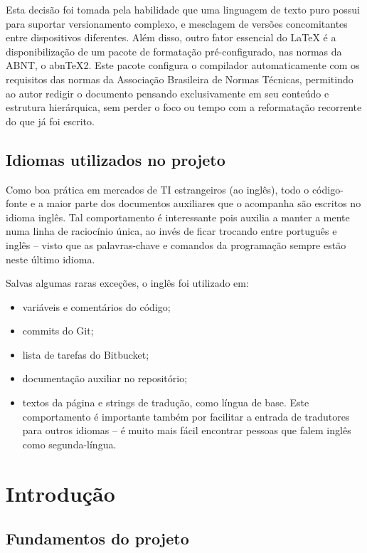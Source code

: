 \documentclass[12pt,a4paper,twoside,hyphens,english,brazil]{abntex2}
\begin{document}
Esta decisão foi tomada pela habilidade que uma linguagem de texto puro possui para suportar versionamento complexo, e mesclagem de versões concomitantes entre dispositivos diferentes. Além disso, outro fator essencial do \LaTeX{} é a disponibilização de um pacote de formatação pré-configurado, nas normas da ABNT, o abn\TeX{}2\cite{abntex2}\cite{abntex2-slides}. Este pacote configura o compilador automaticamente com os requisitos das normas da Associação Brasileira de Normas Técnicas, permitindo ao autor redigir o documento pensando exclusivamente em seu conteúdo e estrutura hierárquica, sem perder o foco ou tempo com a reformatação recorrente do que já foi escrito.

\section*{Idiomas utilizados no projeto}
Como boa prática em mercados de TI estrangeiros (ao inglês), todo o código-fonte e a maior parte dos documentos auxiliares que o acompanha são escritos no idioma inglês. Tal comportamento é interessante pois auxilia a manter a mente numa linha de raciocínio única, ao invés de ficar trocando entre português e inglês -- visto que as palavras-chave e comandos da programação sempre estão neste último idioma.

Salvas algumas raras exceções, o inglês foi utilizado em:
\begin{itemize}
	\item variáveis e comentários do código;
	\item commits do Git;
	\item lista de tarefas do Bitbucket;
	\item documentação auxiliar no repositório;
	\item textos da página e strings de tradução, como língua de base. Este comportamento é importante também por facilitar a entrada de tradutores para outros idiomas -- é muito mais fácil encontrar pessoas que falem inglês como segunda-língua.
\end{itemize}

\textual

\chapter{Introdução}

\section{Fundamentos do projeto}
\end{document}

